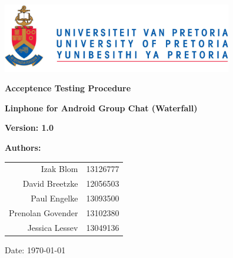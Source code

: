\begin{titlepage}
\begin{flushright}

\includegraphics[width=380px]{../global/University_of_Pretoria_Logo.png}
\newline
\newline

\textbf {\LARGE Acceptence Testing Procedure} \newline

\textbf {\Large Linphone for Android Group Chat (Waterfall)}\newline

\textbf {\large Version: 1.0}\newline

\centering \textbf {\large Authors:}

\begin{table}[H]
\large
\centering
\begin{tabular}{rl}
	Izak Blom & 13126777 \\
	David Breetzke & 12056503 \\
	Paul Engelke & 13093500 \\
	Prenolan Govender & 13102380 \\
	Jessica Lessev & 13049136 \\
\end{tabular}
\end{table}

Date: \today

\end{flushright}
\end{titlepage}